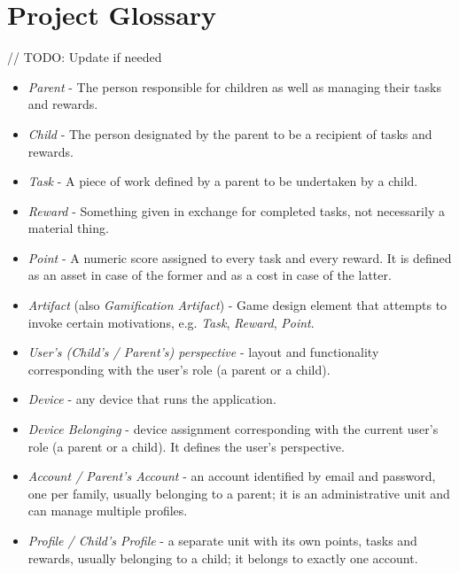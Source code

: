 \section{Project Glossary}\label{sec:assumptions:glossary}
// TODO: Update if needed
\begin{itemize}
    \item \textit{Parent} - The person responsible for children as well as managing their tasks and rewards.
    \item \textit{Child} - The person designated by the parent to be a recipient of tasks and rewards.
    \item \textit{Task} - A piece of work defined by a parent to be undertaken by a child.  
    \item \textit{Reward} - Something given in exchange for completed tasks, not necessarily a material thing.
    \item \textit{Point} - A numeric score assigned to every task and every reward. It is defined as an asset in case of the former and as a cost in case of the latter.
    \item \textit{Artifact} (also \textit{Gamification Artifact}) - Game design element that attempts to invoke certain motivations, e.g. \textit{Task}, \textit{Reward}, \textit{Point}.
    \item \textit{User's (Child's / Parent's) perspective} - layout and functionality corresponding with the user's role (a parent or a child). 
    \item \textit{Device} - any device that runs the application.
    \item \textit{Device Belonging} - device assignment corresponding with the current user's role (a parent or a child). It defines the user's perspective.
    \item \textit{Account / Parent's Account} - an account identified by email and password, one per family, usually belonging to a parent; it is an administrative unit and can manage multiple profiles.
    \item \textit{Profile / Child's Profile} - a separate unit with its own points, tasks and rewards, usually belonging to a child; it belongs to exactly one account.
\end{itemize}
